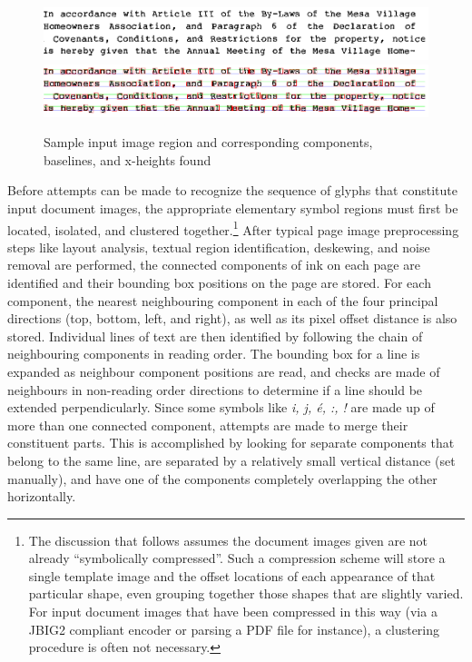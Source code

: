 \documentclass[times, 10pt,twocolumn]{article}
\begin{document}
\begin{figure}[ht]
  \centering
  \includegraphics[scale=1]{figures/input_lines}
  \includegraphics[scale=1]{figures/line_comps}
  \caption{Sample input image region and corresponding components, baselines,
           and x-heights found}
  \label{inimg_fig}
\end{figure}

\label{clustering_sec}

Before attempts can be made to recognize the sequence of glyphs that 
constitute input document images, the appropriate elementary symbol regions 
must first be located, isolated, and clustered together.\footnote{The
discussion that follows assumes the document images given are not
already ``symbolically compressed''. Such a compression scheme will
store a single template image and the offset locations of each
appearance of that particular shape, even grouping together
those shapes that are slightly varied.  For input document images that
have been compressed in this way (via a JBIG2 compliant encoder 
or parsing a PDF file for instance), a clustering procedure is often not necessary.}
After typical page image preprocessing steps like layout analysis, textual
region identification, deskewing, and noise removal are performed, the
connected components of ink on each page are identified and their bounding box
positions on the page are stored.  For each component, the nearest neighbouring
component in each of the four principal directions (top, bottom, left, and
right), as well as its pixel offset distance is also stored.  Individual lines
of text are then identified by following the chain of neighbouring components in
reading order.  The bounding box for a line is expanded as neighbour
component positions are read, and checks are made of neighbours in non-reading
order directions to determine if a line should be extended perpendicularly.
%
Since some symbols like {\em i, j, \'{e}, :, !} are made up of more than one
connected component, attempts are made to merge their constituent parts.  This
is accomplished by looking for separate components that belong to the same
line, are separated by a relatively small vertical distance (set manually), and
have one of the components completely overlapping the other horizontally.
\end{document}

